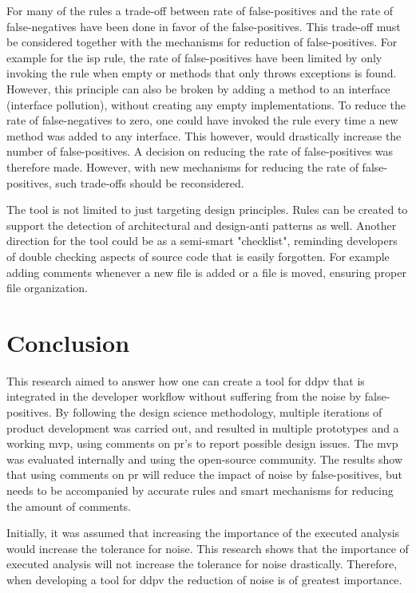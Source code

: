 \documentclass{report}
\begin{document}
For many of the rules a trade-off between rate of false-positives and the rate of false-negatives have been done in favor of the false-positives. This trade-off must be considered together with the mechanisms for reduction of false-positives. For example for the \gls{isp} rule, the rate of false-positives have been limited by only invoking the rule when empty or methods that only throws exceptions is found. However, this principle can also be broken by adding a method to an interface (interface pollution), without creating any empty implementations. To reduce the rate of false-negatives to zero, one could have invoked the rule every time a new method was added to any interface. This however, would drastically increase the number of false-positives. A decision on reducing the rate of false-positives was therefore made. However, with new mechanisms for reducing the rate of false-positives, such trade-offs should be reconsidered. 


The tool is not limited to just targeting design principles. Rules can be created to support the detection of architectural and design-anti patterns as well. Another direction for the tool could be as a semi-smart "checklist", reminding developers of double checking aspects of source code that is easily forgotten. For example adding comments whenever a new file is added or a file is moved, ensuring proper file organization. 

\section{Conclusion}
\label{conclusion}

This research aimed to answer how one can create a tool for \gls{ddpv} that is integrated in the developer workflow without suffering from the noise by false-positives. By following the design science methodology, multiple iterations of product development was carried out, and resulted in multiple prototypes and a working \gls{mvp}, using comments on \gls{pr}'s to report possible design issues. The \gls{mvp} was evaluated internally and using the open-source community. The results show that using comments on \gls{pr} will reduce the impact of noise by false-positives, but needs to be accompanied by accurate rules and smart mechanisms for reducing the amount of comments. 

Initially, it was assumed that increasing the importance of the executed analysis would increase the tolerance for noise. This research shows that the importance of executed analysis will not increase the tolerance for noise drastically. Therefore, when developing a tool for \gls{ddpv} the reduction of noise is of greatest importance.
\end{document}
